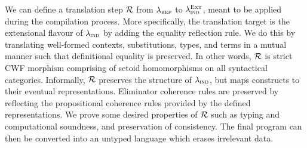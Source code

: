 We can define a translation step $\mathcal{R}$ from $\lambda_{\textsc{rep}}$ to
$\lambda_{\textsc{ind}}^{\textsc{Ext}}$, meant to be applied during the compilation process.
More specifically, the translation target is the extensional flavour of
$\lambda_{\textsc{ind}}$ by adding the equality reflection rule. We do this by translating
well-formed contexts, substitutions, types, and terms in a mutual manner such
that definitional equality is preserved. In other words, $\mathcal{R}$ is strict CWF
morphism comprising of setoid homomorphisms on all syntactical categories.
Informally, $\mathcal{R}$ preserves the structure of $\lambda_{\textsc{ind}}$, but maps constructs to
their eventual representations. Eliminator coherence rules are preserved by
reflecting the propositional coherence rules provided by the defined
representations. We prove some desired properties of $\mathcal{R}$ \cite{Boulier2017-cm}
such as typing and computational soundness, and preservation of consistency. The
final program can then be converted into an untyped language which erases
irrelevant data.
